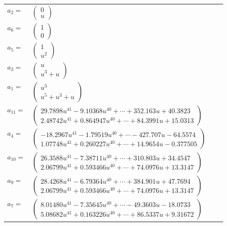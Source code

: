 \documentclass[1p]{elsarticle_modified}
\theoremstyle{definition}
\begin{document}
\begin{tabular}{m{7pt} m{180pt} m{7pt} m{180pt} }
\flushright $a_{2}=$&$\begin{pmatrix}0\\u\end{pmatrix}$ \\
\flushright $a_{6}=$&$\begin{pmatrix}1\\0\end{pmatrix}$ \\
\flushright $a_{5}=$&$\begin{pmatrix}1\\u^2\end{pmatrix}$ \\
\flushright $a_{3}=$&$\begin{pmatrix}u\\u^3+u\end{pmatrix}$ \\
\flushright $a_{1}=$&$\begin{pmatrix}u^3\\u^5+u^3+u\end{pmatrix}$ \\
\flushright $a_{11}=$&$\begin{pmatrix}29.7898 u^{41}-9.10368 u^{40}+\cdots+352.163 u+40.3823\\2.48742 u^{41}+0.864947 u^{40}+\cdots+84.3991 u+15.0313\end{pmatrix}$ \\
\flushright $a_{4}=$&$\begin{pmatrix}-18.2967 u^{41}-1.79519 u^{40}+\cdots-427.707 u-64.5574\\1.07748 u^{41}+0.260227 u^{40}+\cdots+14.9654 u-0.377505\end{pmatrix}$ \\
\flushright $a_{10}=$&$\begin{pmatrix}26.3588 u^{41}-7.38711 u^{40}+\cdots+310.803 u+34.4547\\2.06799 u^{41}+0.593466 u^{40}+\cdots+74.0976 u+13.3147\end{pmatrix}$ \\
\flushright $a_{9}=$&$\begin{pmatrix}28.4268 u^{41}-6.79364 u^{40}+\cdots+384.901 u+47.7694\\2.06799 u^{41}+0.593466 u^{40}+\cdots+74.0976 u+13.3147\end{pmatrix}$ \\
\flushright $a_{7}=$&$\begin{pmatrix}8.01480 u^{41}-7.35645 u^{40}+\cdots-49.3603 u-18.0733\\5.08682 u^{41}+0.163226 u^{40}+\cdots+86.5337 u+9.31672\end{pmatrix}$ \\

\end{tabular}
\end{document}
